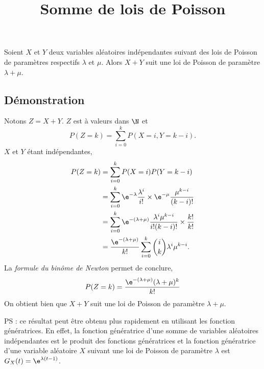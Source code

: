 \documentclass[fontsize=12pt,twoside=false,parskip=half, french]{scrartcl}
\title{Somme de lois de Poisson}
\date{}
\author{}
\begin{document}
\maketitle
   \begin{Theoreme}
      Soient $X$ et $Y$ deux variables aléatoires indépendantes suivant des lois
      de Poisson de paramètres respectifs $\lambda$ et $\mu$. Alors
      $X + Y$ suit une loi de Poisson de paramètre $\lambda + \mu$.
   \end{Theoreme}
   \subsection{Démonstration}
      Notons $Z = X + Y$. $Z$ est à valeurs dans $\N$ et
      \[
         P(Z = k) = \sum_{i = 0}^k P(X = i, Y = k - i).
      \]
      $X$ et $Y$ étant indépendantes,       
      \begin{align*}
         P(Z = k) &= \sum_{i = 0}^k P(X = i)P(Y = k - i)\\
                  &= \sum_{i = 0}^k \e^{-\lambda} \frac{\lambda^i}{i!} \times
                                    \e^{-\mu} \frac{\mu^{k - i}}{(k - i)!}\\
                  &= \sum_{i = 0}^k \e^{-(\lambda + \mu)} 
                                    \frac{\lambda^i \mu^{k - i}}{i!(k - i)!}  
                                    \times \frac{k!}{k!}\\
                  &= \frac{\e^{-(\lambda + \mu)}}{k!} 
                     \sum_{i = 0}^k \binom{i}{k} \lambda^i \mu^{k - i}.
      \end{align*}
      La \emph{formule du binôme de Newton} permet de conclure,
      \[
         P(Z = k) = \frac{\e^{-(\lambda + \mu)} (\lambda + \mu)^k}{k!}
      \]
      On obtient bien que $X + Y$ suit une loi de Poisson de paramètre 
      $\lambda + \mu$.
      
      PS : ce résultat peut être obtenu plus rapidement en utilisant les fonction
      génératrices. En effet, la fonction génératrice d’une somme de variables 
      aléatoires indépendantes est le produit des fonctions génératrices et 
      la fonction génératrice d’une variable aléatoire $X$ suivant une loi de
      Poisson de paramètre $\lambda$ est $G_X(t) = \e^{\lambda(t - 1)}$.
\end{document}
